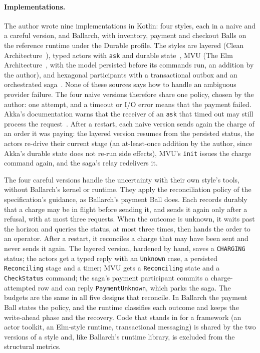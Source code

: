 \documentclass[11pt]{article}
\theoremstyle{definition}
\theoremstyle{plain}
\begin{document}
\paragraph{Implementations.} The author wrote nine implementations in Kotlin: four styles, each in a naive and a careful version, and Ballarch, with inventory, payment and checkout Balls on the reference runtime under the Durable profile. The styles are layered (Clean Architecture~\citep{Martin2017Clean}), typed actors with \texttt{ask} and durable state~\citep{HewittBishopSteiger1973,AkkaDocs}, MVU (The Elm Architecture~\citep{ElmGuide,Czaplicki2016Farewell}, with the model persisted before its commands run, an addition by the author), and hexagonal participants with a transactional outbox and an orchestrated saga~\citep{Richardson2018,GarciaMolinaSalem1987}. None of these sources says how to handle an ambiguous provider failure. The four naive versions therefore share one policy, chosen by the author: one attempt, and a timeout or I/O error means that the payment failed. Akka's documentation warns that the receiver of an \texttt{ask} that timed out may still process the request~\citep{AkkaDocs}. After a restart, each naive version sends again the charge of an order it was paying: the layered version resumes from the persisted status, the actors re-drive their current stage (an at-least-once addition by the author, since Akka's durable state does not re-run side effects), MVU's \texttt{init} issues the charge command again, and the saga's relay redelivers it.

The four careful versions handle the uncertainty with their own style's tools, without Ballarch's kernel or runtime. They apply the reconciliation policy of the specification's guidance, as Ballarch's payment Ball does. Each records durably that a charge may be in flight before sending it, and sends it again only after a refusal, with at most three requests. When the outcome is unknown, it waits past the horizon and queries the status, at most three times, then hands the order to an operator. After a restart, it reconciles a charge that may have been sent and never sends it again. The layered version, hardened by hand, saves a \texttt{CHARGING} status; the actors get a typed reply with an \texttt{Unknown} case, a persisted \texttt{Reconciling} stage and a timer; MVU gets a \texttt{Reconciling} state and a \texttt{CheckStatus} command; the saga's payment participant commits a charge-attempted row and can reply \texttt{PaymentUnknown}, which parks the saga. The budgets are the same in all five designs that reconcile. In Ballarch the payment Ball states the policy, and the runtime classifies each outcome and keeps the write-ahead phase and the recovery. Code that stands in for a framework (an actor toolkit, an Elm-style runtime, transactional messaging) is shared by the two versions of a style and, like Ballarch's runtime library, is excluded from the structural metrics.
\end{document}
